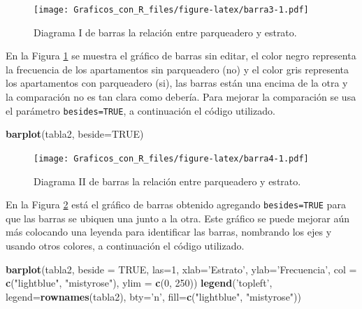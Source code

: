 \documentclass[10pt,]{krantz}
\makeatletter
\newenvironment{Shaded}{\begin{snugshade}}{\end{snugshade}}
\newcommand{\KeywordTok}[1]{\textcolor[rgb]{0.13,0.29,0.53}{\textbf{{#1}}}}
\newcommand{\DataTypeTok}[1]{\textcolor[rgb]{0.13,0.29,0.53}{{#1}}}
\newcommand{\DecValTok}[1]{\textcolor[rgb]{0.00,0.00,0.81}{{#1}}}
\newcommand{\StringTok}[1]{\textcolor[rgb]{0.31,0.60,0.02}{{#1}}}
\newcommand{\OtherTok}[1]{\textcolor[rgb]{0.56,0.35,0.01}{{#1}}}
\newcommand{\NormalTok}[1]{{#1}}
\newenvironment{kframe}{%
\medskip{}
\setlength{\fboxsep}{.8em}
 \def\at@end@of@kframe{}%
 \ifinner\ifhmode%
  \def\at@end@of@kframe{\end{minipage}}%
  \begin{minipage}{\columnwidth}%
 \fi\fi%
 \def\FrameCommand##1{\hskip\@totalleftmargin \hskip-\fboxsep
 \colorbox{shadecolor}{##1}\hskip-\fboxsep
     \hskip-\linewidth \hskip-\@totalleftmargin \hskip\columnwidth}%
 \MakeFramed {\advance\hsize-\width
   \@totalleftmargin\z@ \linewidth\hsize
   \@setminipage}}%
 {\par\unskip\endMakeFramed%
 \at@end@of@kframe}
\renewenvironment{Shaded}{\begin{kframe}}{\end{kframe}}
\makeatother
\begin{document}
\begin{figure}[htbp]
\centering
\texttt{[image: Graficos\_con\_R\_files/figure-latex/barra3-1.pdf]}
\caption{\label{fig:barra3}Diagrama I de barras la relación entre
parqueadero y estrato.}
\end{figure}

En la Figura \ref{fig:barra3} se muestra el gráfico de barras sin
editar, el color negro representa la frecuencia de los apartamentos sin
parqueadero (no) y el color gris representa los apartamentos con
parqueadero (si), las barras están una encima de la otra y la
comparación no es tan clara como debería. Para mejorar la comparación se
usa el parámetro \texttt{besides=TRUE}, a continuación el código
utilizado.

\begin{Shaded}
\begin{Highlighting}[]
\KeywordTok{barplot}\NormalTok{(tabla2, }\DataTypeTok{beside=}\OtherTok{TRUE}\NormalTok{)}
\end{Highlighting}
\end{Shaded}

\begin{figure}[htbp]
\centering
\texttt{[image: Graficos\_con\_R\_files/figure-latex/barra4-1.pdf]}
\caption{\label{fig:barra4}Diagrama II de barras la relación entre
parqueadero y estrato.}
\end{figure}

En la Figura \ref{fig:barra4} está el gráfico de barras obtenido
agregando \texttt{besides=TRUE} para que las barras se ubiquen una junto
a la otra. Este gráfico se puede mejorar aún más colocando una leyenda
para identificar las barras, nombrando los ejes y usando otros colores,
a continuación el código utilizado.

\begin{Shaded}
\begin{Highlighting}[]
\KeywordTok{barplot}\NormalTok{(tabla2, }\DataTypeTok{beside =} \OtherTok{TRUE}\NormalTok{, }\DataTypeTok{las=}\DecValTok{1}\NormalTok{, }
        \DataTypeTok{xlab=}\StringTok{'Estrato'}\NormalTok{, }\DataTypeTok{ylab=}\StringTok{'Frecuencia'}\NormalTok{,}
        \DataTypeTok{col =} \KeywordTok{c}\NormalTok{(}\StringTok{"lightblue"}\NormalTok{, }\StringTok{"mistyrose"}\NormalTok{),}
        \DataTypeTok{ylim =} \KeywordTok{c}\NormalTok{(}\DecValTok{0}\NormalTok{, }\DecValTok{250}\NormalTok{))}
\KeywordTok{legend}\NormalTok{(}\StringTok{'topleft'}\NormalTok{, }\DataTypeTok{legend=}\KeywordTok{rownames}\NormalTok{(tabla2), }\DataTypeTok{bty=}\StringTok{'n'}\NormalTok{,}
       \DataTypeTok{fill=}\KeywordTok{c}\NormalTok{(}\StringTok{"lightblue"}\NormalTok{, }\StringTok{"mistyrose"}\NormalTok{))}
\end{Highlighting}
\end{Shaded}
\end{document}
